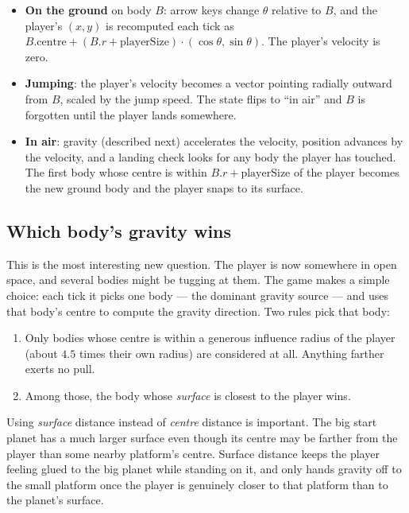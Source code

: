 \begin{itemize}
    \item \textbf{On the ground} on body $B$: arrow keys change
    $\theta$ relative to $B$, and the player's $(x, y)$ is recomputed
    each tick as $B.\text{centre} + (B.r + \text{playerSize}) \cdot
    (\cos\theta, \sin\theta)$. The player's velocity is zero.
    \item \textbf{Jumping}: the player's velocity becomes a vector
    pointing radially outward from $B$, scaled by the jump speed. The
    state flips to ``in air'' and $B$ is forgotten until the player
    lands somewhere.
    \item \textbf{In air}: gravity (described next) accelerates the
    velocity, position advances by the velocity, and a landing check
    looks for any body the player has touched. The first body whose
    centre is within $B.r + \text{playerSize}$ of the player becomes
    the new ground body and the player snaps to its surface.
\end{itemize}

\subsection*{Which body's gravity wins}

This is the most interesting new question. The player is now somewhere
in open space, and several bodies might be tugging at them. The game
makes a simple choice: each tick it picks one body --- the dominant
gravity source --- and uses that body's centre to compute the gravity
direction. Two rules pick that body:

\begin{enumerate}
    \item Only bodies whose centre is within a generous influence
    radius of the player (about $4.5$ times their own radius) are
    considered at all. Anything farther exerts no pull.
    \item Among those, the body whose \emph{surface} is closest to
    the player wins.
\end{enumerate}

Using \emph{surface} distance instead of \emph{centre} distance is
important. The big start planet has a much larger surface even though
its centre may be farther from the player than some nearby platform's
centre. Surface distance keeps the player feeling glued to the big
planet while standing on it, and only hands gravity off to the small
platform once the player is genuinely closer to that platform than to
the planet's surface.

